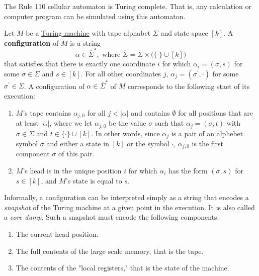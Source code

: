   \begin{theorem}
    \label{thm:rule-110-is-turing-complete}
  The Rule 110 cellular automaton is Turing complete. That is, any calculation or computer program can be simulated using this automaton. 
  \end{theorem}

  \begin{definition}
    \label{def:configuration-of-turing-machines}
  Let $M$ be a \hyperref[def:turing-machine]{Turing machine} with tape alphabet $\Sigma$ and state space $[k]$. A \textbf{configuration} of $M$ is a string 
  \begin{equation}
    \alpha \in \overline{\Sigma}^*, \text{ where } \overline{\Sigma} = \Sigma \times \big( \{ \cdot \} \cup [k] \big)
  \end{equation}
  that satisfies that there is exactly one coordinate $i$ for which $\alpha_i = (\sigma, s)$ for some $\sigma \in \Sigma$ and $s \in [k]$. For all other coordinates $j$, $\alpha_j = (\sigma^\prime, \cdot)$ for some $\sigma^\prime \in \Sigma$. A configuration of $\alpha \in \overline{\Sigma}^*$ of $M$ corresponds to the following staet of its execution: 
  \begin{enumerate}
      \item $M$'s tape contains $\alpha_{j, 0}$ for all $j < |\alpha|$ and contains $\emptyset$ for all positions that are at least $|\alpha|$, where we let $\alpha_{j, 0}$ be the value $\sigma$ such that $\alpha_j = (\sigma, t)$ with $\sigma \in \Sigma$ and $t \in \{\cdot\} \cup [k]$. In other words, since $\alpha_j$ is a pair of an alphebet symbol $\sigma$ and either a state in $[k]$ or the symbol $\cdot$, $\alpha_{j, 0}$ is the first component $\sigma$ of this pair. 
      \item $M$'s head is in the unique position $i$ for which $\alpha_i$ has the form $(\sigma, s)$ for $s \in [k]$, and $M$'s state is equal to $s$. 
  \end{enumerate}
  Informally, a configuration can be interpreted simply as a string that encodes a \textit{snapshot} of the Turing machine at a given point in the execution. It is also called a \textit{core dump}. Such a snapshot must encode the following components: 
  \begin{enumerate}
      \item The current head position. 
      \item The full contents of the large scale memory, that is the tape. 
      \item The contents of the "local registers," that is the state of the machine. 
  \end{enumerate}
  \end{definition}

